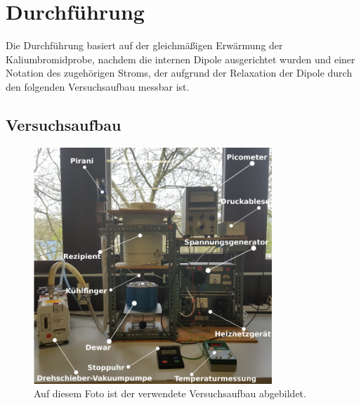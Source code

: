 \section{Durchführung}
\label{sec:Durchführung}

Die Durchführung basiert auf der gleichmäßigen Erwärmung der Kaliumbromidprobe,
nachdem die internen Dipole ausgerichtet wurden und einer Notation des 
zugehörigen Stroms, der aufgrund der Relaxation der Dipole durch den folgenden 
Versuchsaufbau messbar ist.

\subsection{Versuchsaufbau}

\begin{figure}
    \centering
    \includegraphics[width=0.8\textwidth, keepaspectratio]{figure/AufbauFoto.png}
    \caption{Auf diesem Foto ist der verwendete Versuchsaufbau abgebildet. 
    \cite{sample}}
    \label{abb1}
\end{figure}

